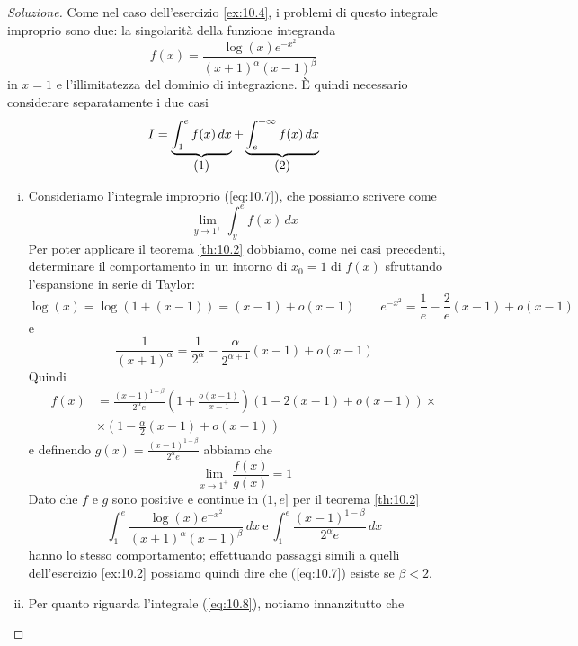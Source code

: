 \begin{proof}[Soluzione]
    Come nel caso dell'esercizio \ref{ex:10.4}, i problemi di questo integrale improprio sono due: la singolarità della funzione integranda
    \[
    f(x) = \frac{\log(x)e^{-x^2}}{(x+1)^{\alpha}(x-1)^\beta}
    \]
    in $x=1$ e l'illimitatezza del dominio di integrazione. \`E quindi necessario considerare separatamente i due casi
    \[
    I = \underbrace{\int_1^e f(x)\, dx}_{\stepcounter{equation}\mbox{(\theequation)}} + \underbrace{\int_e^{+\infty}f(x)\, dx}_{\stepcounter{equation}\mbox{(\theequation)}}
    \]
    \addtocounter{equation}{-2}\label{eq:10.7}
    \addtocounter{equation}{0}\label{eq:10.8}
    \begin{enumerate}[(i)]
        \item Consideriamo l'integrale improprio (\ref{eq:10.7}), che possiamo scrivere come
        \[
        \lim_{y\to 1^+} \int_y^e f(x)\, dx
        \]
        Per poter applicare il teorema \ref{th:10.2} dobbiamo, come nei casi precedenti, determinare il comportamento in un intorno di $x_0=1$ di $f(x)$ sfruttando l'espansione in serie di Taylor:
        \[
        \log(x)=\log(1+(x-1))= (x-1)+o(x-1) \qquad e^{-x^2} = \frac{1}{e} -\frac{2}{e}(x-1) +o(x-1)
        \]
        e
        \[
        \frac{1}{(x+1)^\alpha} = \frac{1}{2^\alpha } -\frac{\alpha}{2^{\alpha+1}}(x-1) +o(x-1)
        \]
        Quindi
        \[
        \begin{split}
            f(x) & = \frac{(x-1)^{1-\beta}}{2^{\alpha}e}\left(1+\frac{o(x-1)}{x-1}\right)\left(1-2(x-1)+o(x-1)\right)\times \\
            & \times \left(1-\frac{\alpha}{2}(x-1)+o(x-1)\right)
        \end{split}
        \]
        e definendo $g(x) = \frac{(x-1)^{1-\beta}}{2^{\alpha}e}$ abbiamo che
        \[
        \lim_{x\to 1^+} \frac{f(x)}{g(x)} = 1
        \]
        Dato che $f$ e $g$ sono positive e continue in $(1, e]$ per il teorema \ref{th:10.2} 
        \[
        \int_1^e \frac{\log(x)e^{-x^2}}{(x+1)^\alpha(x-1)^\beta}\, dx \ \text{e} \ \int_1^e \frac{(x-1)^{1-\beta}}{2^{\alpha}e}\, dx
        \]
        hanno lo stesso comportamento; effettuando passaggi simili a quelli dell'esercizio \ref{ex:10.2} possiamo quindi dire che (\ref{eq:10.7}) esiste se $\beta<2$.
        \item Per quanto riguarda l'integrale (\ref{eq:10.8}), notiamo innanzitutto che 
        \begin{equation}
            \label{eq:10.9}

\end{equation}
\end{enumerate}
\end{proof}
